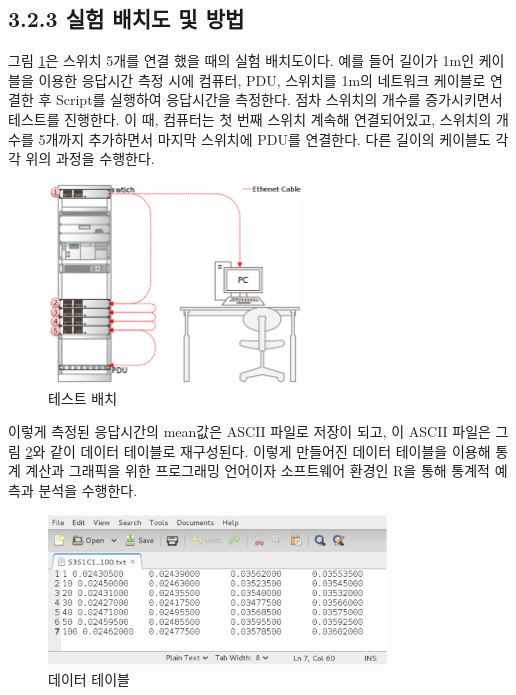 \documentclass[11pt
  , a4paper
  , article
  , oneside
]{memoir}
\begin{document}
\subsection{3.2.3 실험 배치도 및 방법}
그림 \ref{fig:switch}은 스위치 5개를 연결 했을 때의 실험 배치도이다. 예를 들어 길이가 1m인 케이블을 이용한 응답시간 측정 시에 컴퓨터, PDU, 스위치를 1m의 네트워크 케이블로 연결한 후 Script를 실행하여 응답시간을 측정한다. 점차 스위치의 개수를 증가시키면서 테스트를 진행한다. 이 때, 컴퓨터는 첫 번째 스위치 계속해 연결되어있고, 스위치의 개수를 5개까지 추가하면서 마지막 스위치에 PDU를 연결한다. 다른 길이의 케이블도 각각 위의 과정을 수행한다. 

\begin{figure}[!htb]
  \centering
  \includegraphics[width=0.6\textwidth]{./images/switch5.eps}
  \caption{테스트 배치}
  \label{fig:switch}   
\end{figure}

이렇게 측정된 응답시간의 mean값은 ASCII 파일로 저장이 되고, 이 ASCII 파일은 그림 \ref{fig:time_table}와 같이 데이터 테이블로 재구성된다. 이렇게 만들어진 데이터 테이블을 이용해 통계 계산과 그래픽을 위한 프로그래밍 언어이자 소프트웨어 환경인 R\citep{r}을 통해 통계적 예측과 분석을 수행한다. 

\begin{figure}[!htb]
  \centering
  \includegraphics[width=0.8\textwidth]{./images/timetable.eps}
  \caption{데이터 테이블}
  \label{fig:time_table}   
\end{figure}
\end{document}
